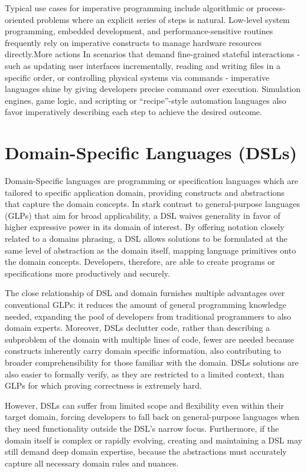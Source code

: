 Typical use cases for imperative programming include algorithmic or process-oriented problems where an explicit series of steps is natural.
Low-level system programming, embedded development, and performance-sensitive routines frequently rely on imperative constructs to manage hardware resources directly.More actions
In scenarios that demand fine-grained stateful interactions - such as updating user interfaces incrementally, reading and writing files in a specific order, or
controlling physical systems via commands - imperative languages shine by giving developers precise command over execution.
Simulation engines, game logic, and scripting or “recipe”-style automation languages also favor imperatively describing each step to achieve the desired outcome.

\section{Domain-Specific Languages (DSLs)}

Domain-Specific languages are programming or specification languages which are tailored to specific application domain, providing constructs and abstractions
that capture the domain concepts. \cite{whenHowDSL} In stark contrast to general-purpose languages (GLPs) that aim for broad applicability, a DSL waives generality in favor
of higher expressive power in its domain of interest. By offering notation closely related to a domains phrasing, a DSL allows solutions to be formulated at the same level
of abstraction as the domain itself, mapping language primitives onto the domain concepts. Developers, therefore, are able to create programs or specifications more
productively and securely.

The close relationship of DSL and domain furnishes multiple advantages over conventional GLPs: it reduces the amount of general programming knowledge needed,
expanding the pool of developers from traditional programmers to also domain experts. Moreover, DSLs declutter code, rather than describing a subproblem of the domain
with multiple lines of code, fewer are needed because constructs inherently carry domain specific information, also contributing to broader comprehensibility for those familiar with the domain.
DSLs solutions are also easier to formally verify, as they are restricted to a limited context, than GLPs for which proving correctness is extremely hard.

However, DSLs can suffer from limited scope and flexibility even within their target domain, forcing developers to fall back on general-purpose languages when they need functionality outside the
DSL's narrow focus. Furthermore, if the domain itself is complex or rapidly evolving, creating and maintaining a DSL may still demand deep domain expertise, because the abstractions must
accurately capture all necessary domain rules and nuances.

